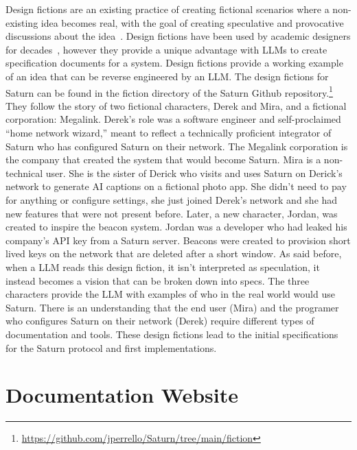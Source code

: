 Design fictions are an existing practice of creating fictional scenarios where a non-existing idea becomes real, with the goal of creating speculative and provocative discussions about the idea~\cite{sterling2009designfiction}. Design fictions have been used by academic designers for decades~\cite{lindley2015designfiction}, however they provide a unique advantage with LLMs to create specification documents for a system. Design fictions provide a working example of an idea that can be reverse engineered by an LLM. The design fictions for Saturn can be found in the fiction directory of the Saturn Github repository.\footnote{\url{https://github.com/jperrello/Saturn/tree/main/fiction}} They follow the story of two fictional characters, Derek and Mira, and a fictional corporation: Megalink. Derek's role was a software engineer and self-proclaimed ``home network wizard,'' meant to reflect a technically proficient integrator of Saturn who has configured Saturn on their network. The Megalink corporation is the company that created the system that would become Saturn. Mira is a non-technical user. She is the sister of Derick who visits and uses Saturn on Derick's network to generate AI captions on a fictional photo app. She didn't need to pay for anything or configure settings, she just joined Derek's network and she had new features that were not present before. Later, a new character, Jordan, was created to inspire the beacon system. Jordan was a developer who had leaked his company's API key from a Saturn server. Beacons were created to provision short lived keys on the network that are deleted after a short window. As said before, when a LLM reads this design fiction, it isn't interpreted as speculation, it instead becomes a vision that can be broken down into specs. The three characters provide the LLM with examples of who in the real world would use Saturn. There is an understanding that the end user (Mira) and the programer who configures Saturn on their network (Derek) require different types of documentation and tools. These design fictions lead to the initial specifications for the Saturn protocol and first implementations.

\section{Documentation Website}

